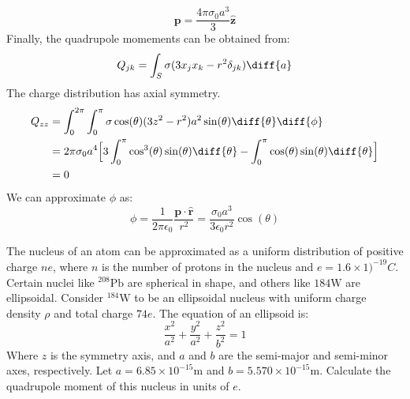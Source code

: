 \documentclass[crop=false,class=book,oneside]{standalone}
\begin{document}
\begin{solution}
\begin{equation}
                    \mathbf{p}=
                    \frac{4\pi\sigma_{0}a^{3}}{3}\hat{\mathbf{z}}
                \end{equation}
                Finally, the quadrupole momements can be
                obtained from:
                \begin{equation}
                    Q_{jk}=\int_{S}\sigma
                        (3x_{j}x_{k}-r^{2}\delta_{jk})\diff{a}
                \end{equation}
                The charge distribution has axial symmetry.
                \begin{subequations}
                    \begin{align}
                        Q_{zz}&=
                        \int_{0}^{2\pi}\int_{0}^{\pi}
                            \sigma\cos(\theta)
                            (3z^{2}-r^{2})a^{2}\sin(\theta)
                            \diff{\theta}\diff{\phi}\\
                        &=2\pi\sigma_{0}a^{4}
                            \Big[3\int_{0}^{\pi}\cos^{3}(\theta)
                                 \sin(\theta)\diff{\theta}-
                                 \int_{0}^{\pi}\cos(\theta)
                                 \sin(\theta)\diff{\theta}\Big]\\
                        &=0
                    \end{align}
                \end{subequations}
                We can approximate $\phi$ as:
                \begin{equation}
                    \phi=\frac{1}{2\pi\epsilon_{0}}
                        \frac{\mathbf{p}\cdot\hat{\mathbf{r}}}{r^{2}}
                        =\frac{\sigma_{0}a^{3}}{3\epsilon_{0}r^{2}}
                            \cos(\theta)
                \end{equation}
            \end{solution}
            \begin{problem}
                The nucleus of an atom can be approximated as a
                uniform distribution of positive charge $ne$,
                where $n$ is the number of protons in the nucleus and
                $e=1.6\times{1)}^{-19}C$. Certain nuclei like
                $^{208}\textrm{Pb}$ are spherical in shape, and
                others like ${184}\textrm{W}$ are ellipsoidal.
                Consider $^{184}\textrm{W}$ to be an ellipsoidal
                nucleus with uniform charge density $\rho$ and
                total charge $74e$. The equation of an ellipsoid is:
                \begin{equation}
                    \frac{x^{2}}{a^{2}}+\frac{y^{2}}{a^{2}}
                                       +\frac{z^{2}}{b^{2}}=1
                \end{equation}
                Where $z$ is the symmetry axis, and $a$ and $b$
                are the semi-major and semi-minor axes, respectively.
                Let $a=6.85\times{10}^{-15}\textrm{m}$ and
                $b=5.570\times{10}^{-15}\textrm{m}$. Calculate the
                quadrupole moment of this nucleus in units of $e$.
            \end{problem}
\end{document}

